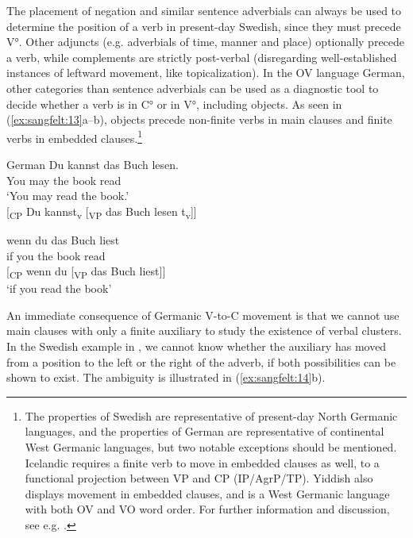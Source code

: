 \documentclass[output=paper, colorlinks, citecolor=brown]{langscibook}
\begin{document}
The placement of negation and similar sentence adverbials can always be used to determine the position of a verb in present-day Swedish, since they must precede V°. Other adjuncts (e.g. adverbials of time, manner and place) optionally precede a verb, while complements are strictly post-verbal (disregarding well-established instances of leftward movement, like topicalization). In the OV language German, other categories than sentence adverbials can be used as a diagnostic tool to decide whether a verb is in C° or in V°, including objects. As seen in (\ref{ex:sangfelt:13}a–b), objects precede non-finite verbs in main clauses and finite verbs in embedded clauses.\footnote{The properties of Swedish are representative of present-day North Germanic languages, and the properties of German are representative of continental West Germanic languages, but two notable exceptions should be mentioned. Icelandic requires a finite verb to move in embedded clauses as well, to a functional projection between VP and CP (IP/AgrP/TP). Yiddish also displays movement in embedded clauses, and is a West Germanic language with both OV and VO word order. For further information and discussion, see e.g. \citet[3–18]{Vikner2001}.}

\ea German\label{ex:sangfelt:13}
\ea\label{ex:sangfelt:13a}
\gll Du kannst das Buch lesen.\\
 You may the book read\\
\glt ‘You may read the book.’\\

[\textsubscript{CP} Du kannst\textsubscript{v} [\textsubscript{VP} {das} {Buch} lesen t\textsubscript{v}]]

\ex\label{ex:sangfelt:13b}
\gll wenn du das Buch liest \\
 if you the book read\\

[\textsubscript{CP} wenn du [\textsubscript{VP} {das} {Buch} liest]]\\

\glt ‘if you read the book’
\z 
\z 

An immediate consequence of Germanic V-to-C movement is that we cannot use main clauses with only a finite auxiliary to study the existence of verbal clusters. In the Swedish example in , we cannot know whether the auxiliary has moved from a position to the left or the right of the adverb, if both possibilities can be shown to exist. The ambiguity is illustrated in (\ref{ex:sangfelt:14}b).
\end{document}
